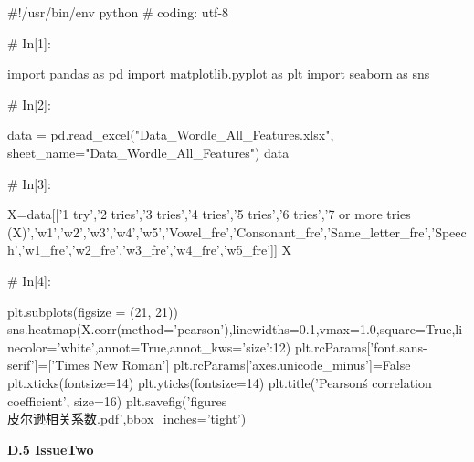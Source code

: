 \documentclass{MathModeling}
\begin{document}
\begin{python}
#!/usr/bin/env python
# coding: utf-8

# In[1]:


import pandas as pd
import matplotlib.pyplot as plt
import seaborn as sns


# In[2]:


data = pd.read_excel("Data_Wordle_All_Features.xlsx", sheet_name="Data_Wordle_All_Features")
data


# In[3]:


X=data[['1 try','2 tries','3 tries','4 tries','5 tries','6 tries','7 or more tries (X)','w1','w2','w3','w4','w5','Vowel_fre','Consonant_fre','Same_letter_fre','Speech','w1_fre','w2_fre','w3_fre','w4_fre','w5_fre']]
X


# In[4]:


plt.subplots(figsize = (21, 21))
sns.heatmap(X.corr(method='pearson'),linewidths=0.1,vmax=1.0,square=True,linecolor='white',annot=True,annot_kws={'size':12})
plt.rcParams['font.sans-serif']=['Times New Roman']
plt.rcParams['axes.unicode_minus']=False
plt.xticks(fontsize=14)
plt.yticks(fontsize=14)
plt.title('Pearson\'s correlation coefficient', size=16)
plt.savefig('figures\\皮尔逊相关系数.pdf',bbox_inches='tight')


\end{python}
\newpage
\textbf{D.5 IssueTwo}
\end{document}
